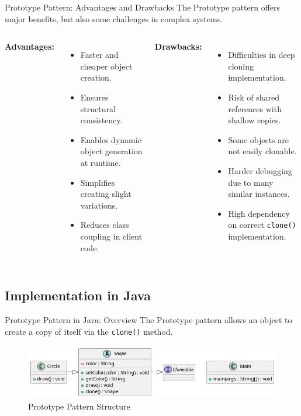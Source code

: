 \documentclass[aspectratio=169, table]{beamer}
\begin{document}
\begin{frame}[fragile]{Prototype Pattern: Advantages and Drawbacks}
	\vspace{20pt}
	The Prototype pattern offers major benefits, but also some challenges in complex systems.
	
	\vspace{10pt}
	\begin{columns}[T]
		\textbf{Advantages:}
		\begin{itemize}
			\item Faster and cheaper object creation.
			\item Ensures structural consistency.
			\item Enables dynamic object generation at runtime.
			\item Simplifies creating slight variations.
			\item Reduces class coupling in client code.
		\end{itemize}
		
		\textbf{Drawbacks:}
		\begin{itemize}
			\item Difficulties in deep cloning implementation.
			\item Risk of shared references with shallow copies.
			\item Some objects are not easily clonable.
			\item Harder debugging due to many similar instances.
			\item High dependency on correct \texttt{clone()} implementation.
		\end{itemize}
	\end{columns}
\end{frame}


\subsection{Implementation in Java}

\begin{frame}[fragile]{Prototype Pattern in Java: Overview}
	\vspace{20pt}
	The Prototype pattern allows an object to create a copy of itself via the \texttt{clone()} method.
	
	\begin{figure}[h]
		\centering
		\includegraphics[width=.9\textwidth]{../../figures/out/prototype.png}
		\caption{Prototype Pattern Structure}
		\label{fig:prototype}
	\end{figure}
\end{frame}
\end{document}
